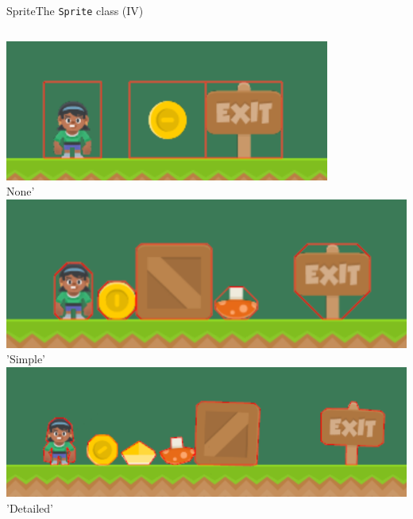 \documentclass[10pt,compress]{beamer} %
\begin{document}
\begin{frame}{Sprite}{The \texttt{Sprite} class (IV)}
    \begin{columns}
		\includegraphics[width=\linewidth]{figs/hitbox-none}\\
		\centering None'
		\includegraphics[width=\linewidth]{figs/hitbox-simple}\\
		\centering 'Simple'
		\includegraphics[width=\linewidth]{figs/hitbox-detailed}\\
		\centering 'Detailed'
    \end{columns}
\end{frame}
\end{document}
